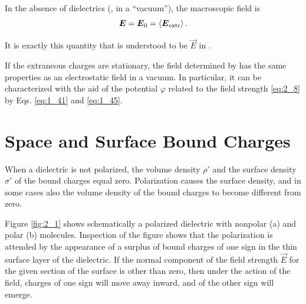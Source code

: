 In the absence of dielectrics (\ie, in a ``vacuum''), the macroscopic field is
\begin{equation*}
    \boldsymbol{E} = \boldsymbol{E}_0 = \left\langle \boldsymbol{E}_{\text{extr}} \right\rangle.
\end{equation*}

\noindent
It is exactly this quantity that is understood to be $\vec{E}$ in .

If the extraneous charges are stationary, the field determined by  has the same properties as an electrostatic field in a vacuum. In particular, it can be characterized with the aid of the potential $\varphi$ related to the field strength \eqref{eq:2_8} by Eqs. \eqref{eq:1_41} and \eqref{eq:1_45}.

\section{Space and Surface Bound Charges}\label{sec:2_4}

When a dielectric is not polarized, the volume density $\rho'$ and the surface density $\sigma'$ of the bound charges equal zero. Polarization causes the surface density, and in some cases also the volume density of the bound charges to become different from zero.

Figure \ref{fig:2_1} shows schematically a polarized dielectric with nonpolar (a) and polar (b) molecules. Inspection of the figure shows that the polarization is attended by the appearance of a surplus of bound charges of one sign in the thin surface layer of the dielectric. If the normal component of the field strength $\vec{E}$ for the given section of the surface is other than zero, then under the action of the field, charges of one sign will move away inward, and of the other sign will emerge.

